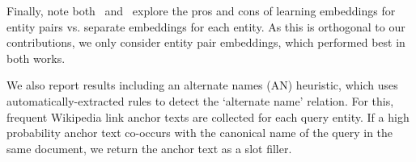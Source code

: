 Finally, note both~\citet{toutanova2015representing} and~\citet{limin} explore the pros and cons of learning embeddings for entity pairs vs. separate embeddings for each entity. As this is orthogonal to our contributions, we only consider entity pair embeddings, which performed best in both works.

We also report results including an alternate names (AN) heuristic, which uses automatically-extracted rules to detect the `alternate name' relation.
For this, frequent Wikipedia link anchor texts are collected for each query entity.
If a high probability anchor text co-occurs with the canonical name of the query in the same document, we return the anchor text as a slot filler.